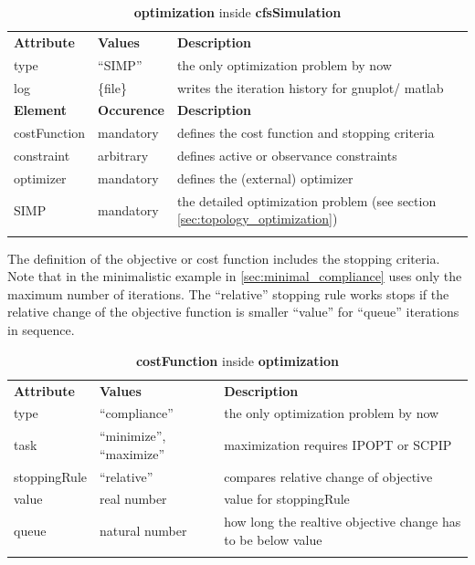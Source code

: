 \begin{center}
\begin{longtable}{llp{}}
\hline\noalign{\smallskip}
\textbf{Attribute} & \textbf{Values} & \textbf{Description} \\
\noalign{\smallskip}\hline\noalign{\smallskip}
type     & ``SIMP''  & the only optimization problem by now \\
log      & \{file\} & writes the iteration history for gnuplot/ matlab \\
\hline\noalign{\smallskip}
\textbf{Element} & \textbf{Occurence} & \textbf{Description} \\
\noalign{\smallskip}\hline\noalign{\smallskip}
costFunction & mandatory & defines the cost function and stopping criteria \\          
constraint & arbitrary & defines active or observance constraints \\
optimizer & mandatory & defines the (external) optimizer \\
SIMP & mandatory & the detailed optimization problem (see section \ref{sec:topology_optimization}) \\
\noalign{\smallskip}\hline\noalign{\smallskip}
\caption{\textbf{optimization} inside \textbf{cfsSimulation}}
\end{longtable}
\end{center} 

The definition of the objective or cost function includes the stopping criteria.
Note that in the minimalistic example in \ref{sec:minimal_compliance} uses only
the maximum number of iterations. The ``relative'' stopping rule works stops
if the relative change of the objective function is smaller ``value'' for ``queue'' iterations in sequence.

\begin{center}
\begin{longtable}{llp{}}
\hline\noalign{\smallskip}
\textbf{Attribute} & \textbf{Values} & \textbf{Description} \\
\noalign{\smallskip}\hline\noalign{\smallskip}
type     & ``compliance''  & the only optimization problem by now \\
task     & ``minimize'', ``maximize'' & maximization requires IPOPT or SCPIP \\
stoppingRule & ``relative'' & compares relative change of objective \\
value & real number & value for stoppingRule \\
queue & natural number & how long the realtive objective change has to be below value \\
\noalign{\smallskip}\hline\noalign{\smallskip}
\caption{\textbf{costFunction} inside \textbf{optimization}}
\end{longtable}
\end{center} 

